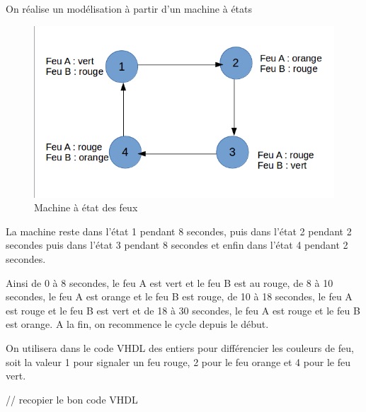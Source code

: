 \documentclass[11pt]{report}
\begin{document}
On réalise un modélisation à partir d'un machine à états

\begin{figure}[h]
\includegraphics[width=12cm]{TP03-2.png}
\caption{Machine à état des feux}
\end{figure}

La machine reste dans l'état 1 pendant 8 secondes, puis dans l'état 2 pendant 2 secondes puis dans l'état 3 pendant 8 secondes et enfin dans l'état 4 pendant 2 secondes. 

Ainsi de 0 à 8 secondes, le feu A est vert et le feu B est au rouge, de 8 à 10 secondes, le feu A est orange et le feu B est rouge, de 10 à 18 secondes, le feu A est rouge et le feu B est vert et de 18 à 30 secondes, le feu A est rouge et le feu B est orange. A la fin, on recommence le cycle depuis le début. 


On utilisera dans le code VHDL des entiers pour différencier les couleurs de feu, soit la valeur 1 pour signaler un feu rouge, 2 pour le feu orange et 4 pour le feu vert.






// recopier le bon code VHDL
\end{document}

